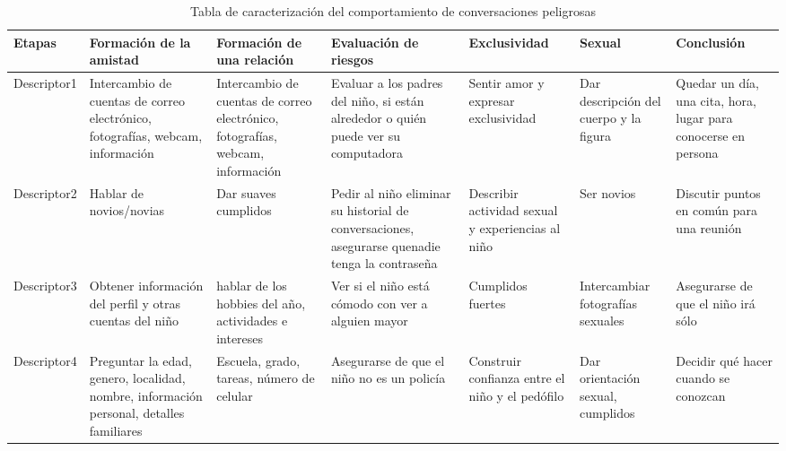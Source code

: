\begin{table}[h]

\begin{tabular}[t]{|p{15mm} |p{22mm} |p{22mm} |p{22mm} |p{20mm} |p{20mm} |p{20mm} |}
\hline
\hline
Etapas & Formaci\'on de la amistad & Formaci\'on de una relaci\'on & Evaluaci\'on de riesgos & Exclusividad & Sexual & Conclusi\'on \\
\hline
Descriptor1 & Intercambio de cuentas de correo electr\'onico, fotograf\'ias, webcam, informaci\'on & Intercambio de cuentas de correo electr\'onico, fotograf\'ias, webcam, informaci\'on & Evaluar a los padres del ni\~no, si est\'an alrededor o qui\'en puede ver su computadora & Sentir amor y expresar exclusividad & Dar descripci\'on del cuerpo y la figura & Quedar un d\'ia, una cita, hora, lugar para conocerse en persona \\
\hline
Descriptor2 &Hablar de novios/novias & Dar suaves cumplidos & Pedir al ni\~no eliminar su historial de conversaciones, asegurarse quenadie tenga la contrase\~na & Describir actividad sexual y experiencias al ni\~no &Ser novios &Discutir puntos en com\'un para una reuni\'on \\
\hline
Descriptor3 &Obtener informaci\'on del perfil y otras cuentas del ni\~no & hablar de los hobbies del a\~no, actividades e intereses & Ver si el ni\~no est\'a c\'omodo con ver a alguien mayor& Cumplidos fuertes & Intercambiar fotograf\'ias sexuales & Asegurarse de que el ni\~no ir\'a s\'olo \\
\hline
Descriptor4 & Preguntar la edad, genero, localidad, nombre, informaci\'on personal, detalles familiares & Escuela, grado, tareas, n\'umero de celular & Asegurarse de que el ni\~no no es un polic\'ia & Construir confianza entre el ni\~no y el ped\'ofilo & Dar orientaci\'on sexual, cumplidos & Decidir qu\'e hacer cuando se conozcan\\
\hline
\end{tabular} \\ \\ \\
\caption{Tabla de caracterizaci\'on del comportamiento de conversaciones peligrosas}
\label{table:caracterizacion}
\end{table}